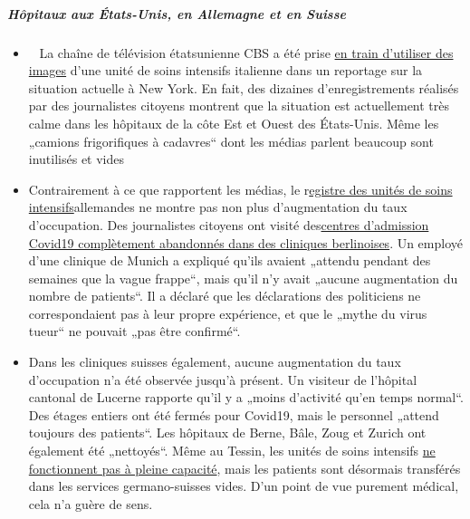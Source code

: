 \hypertarget{huxf4pitaux-aux-uxe9tats-unis-en-allemagne-et-en-suisse}{%
\subparagraph{\texorpdfstring{\textbf{Hôpitaux aux États-Unis, en
Allemagne et en
Suisse}}{Hôpitaux aux États-Unis, en Allemagne et en Suisse}}\label{huxf4pitaux-aux-uxe9tats-unis-en-allemagne-et-en-suisse}}

\begin{itemize}
\tightlist
\item
  ~ La chaîne de télévision étatsunienne CBS a été prise
  \href{https://www.theblaze.com/news/cbs-news-footage-italy-hospital-nyc}{en
  train d'utiliser des images} d'une unité de soins intensifs italienne
  dans un reportage sur la situation actuelle à New York. En fait, des
  dizaines d'enregistrements réalisés par des journalistes citoyens
  montrent que la situation est actuellement très calme dans les
  hôpitaux de la côte Est et Ouest des États-Unis. Même les „camions
  frigorifiques à cadavres`` dont les médias parlent beaucoup sont
  inutilisés et vides
\item
  Contrairement à ce que rapportent les médias, le
  r\href{https://www.divi.de/register/intensivregister}{egistre des
  unités de soins intensifs}allemandes ne montre pas non plus
  d'augmentation du taux d'occupation. Des journalistes citoyens ont
  visité des\href{https://www.youtube.com/watch?v=WiJszJmGdxY}{centres
  d'admission Covid19 complètement abandonnés dans des cliniques
  berlinoises}. Un employé d'une clinique de Munich a expliqué qu'ils
  avaient „attendu pendant des semaines que la vague frappe``, mais
  qu'il n'y avait „aucune augmentation du nombre de patients``. Il a
  déclaré que les déclarations des politiciens ne correspondaient pas à
  leur propre expérience, et que le „mythe du virus tueur`` ne pouvait
  „pas être confirmé``.
\item
  Dans les cliniques suisses également, aucune augmentation du taux
  d'occupation n'a été observée jusqu'à présent. Un visiteur de
  l'hôpital cantonal de Lucerne rapporte qu'il y a „moins d'activité
  qu'en temps normal``. Des étages entiers ont été fermés pour Covid19,
  mais le personnel „attend toujours des patients``. Les hôpitaux de
  Berne, Bâle, Zoug et Zurich ont également été „nettoyés``. Même au
  Tessin, les unités de soins intensifs
  \href{https://www.nzz.ch/schweiz/tessin-verlegt-erste-corona-patienten-in-deutschschweizer-spitaeler-ld.1549417}{ne
  fonctionnent pas à pleine capacité}, mais les patients sont désormais
  transférés dans les services germano-suisses vides. D'un point de vue
  purement médical, cela n'a guère de sens.
\end{itemize}

